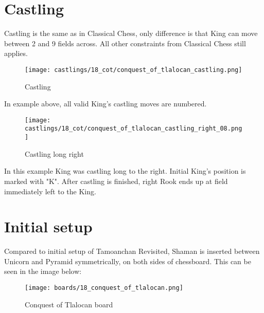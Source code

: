 \clearpage %

\section*{Castling}

Castling is the same as in Classical Chess, only difference is that King can move between 2 and 9 fields across.
All other constraints from Classical Chess still applies.

\noindent
\begin{figure}[!h]
\texttt{[image: castlings/18\_cot/conquest\_of\_tlalocan\_castling.png]}
\caption{Castling}
\label{fig:conquest_of_tlalocan_castling}
\end{figure}

In example above, all valid King's castling moves are numbered.

\noindent
\begin{figure}[!h]
\texttt{[image: castlings/18\_cot/conquest\_of\_tlalocan\_castling\_right\_08.png]}
\caption{Castling long right}
\label{fig:conquest_of_tlalocan_castling_right_08}
\end{figure}

In this example King was castling long to the right. Initial King's position is marked with "K".
After castling is finished, right Rook ends up at field immediately left to the King.

\clearpage %

\section*{Initial setup}

Compared to initial setup of Tamoanchan Revisited, Shaman is inserted between Unicorn and Pyramid
symmetrically, on both sides of chessboard. This can be seen in the image below:

\noindent
\begin{figure}[h]
\texttt{[image: boards/18\_conquest\_of\_tlalocan.png]}
\caption{Conquest of Tlalocan board}
\label{fig:18_conquest_of_tlalocan}
\end{figure}

\clearpage %
